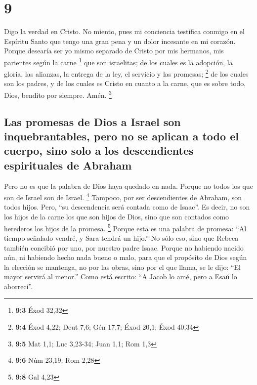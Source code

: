 \hypertarget{section-8}{%
\section{9}\label{section-8}}

 Digo la verdad en Cristo. No miento, pues mi conciencia
testifica conmigo en el Espíritu Santo  que tengo una gran
pena y un dolor incesante en mi corazón.  Porque desearía
ser yo mismo separado de Cristo por mis hermanos, mis parientes según la
carne \footnote{\textbf{9:3} Éxod 32,32}  que son
israelitas; de los cuales es la adopción, la gloria, las alianzas, la
entrega de la ley, el servicio y las promesas; \footnote{\textbf{9:4}
  Éxod 4,22; Deut 7,6; Gén 17,7; Éxod 20,1; Éxod 40,34} 
de los cuales son los padres, y de los cuales es Cristo en cuanto a la
carne, que es sobre todo, Dios, bendito por siempre. Amén. \footnote{\textbf{9:5}
  Mat 1,1; Luc 3,23-34; Juan 1,1; Rom 1,3}

\hypertarget{las-promesas-de-dios-a-israel-son-inquebrantables-pero-no-se-aplican-a-todo-el-cuerpo-sino-solo-a-los-descendientes-espirituales-de-abraham}{%
\subsection{Las promesas de Dios a Israel son inquebrantables, pero no
se aplican a todo el cuerpo, sino solo a los descendientes espirituales
de
Abraham}\label{las-promesas-de-dios-a-israel-son-inquebrantables-pero-no-se-aplican-a-todo-el-cuerpo-sino-solo-a-los-descendientes-espirituales-de-abraham}}

 Pero no es que la palabra de Dios haya quedado en nada.
Porque no todos los que son de Israel son de Israel. \footnote{\textbf{9:6}
  Núm 23,19; Rom 2,28}  Tampoco, por ser descendientes de
Abraham, son todos hijos. Pero, ``su descendencia será contada como de
Isaac''.  Es decir, no son los hijos de la carne los que
son hijos de Dios, sino que son contados como herederos los hijos de la
promesa. \footnote{\textbf{9:8} Gal 4,23}  Porque esta es
una palabra de promesa: ``Al tiempo señalado vendré, y Sara tendrá un
hijo.''  No sólo eso, sino que Rebeca también concibió
por uno, por nuestro padre Isaac.  Porque no habiendo
nacido aún, ni habiendo hecho nada bueno o malo, para que el propósito
de Dios según la elección se mantenga, no por las obras, sino por el que
llama,  se le dijo: ``El mayor servirá al menor.''
 Como está escrito: ``A Jacob lo amé, pero a Esaú lo
aborrecí''.

